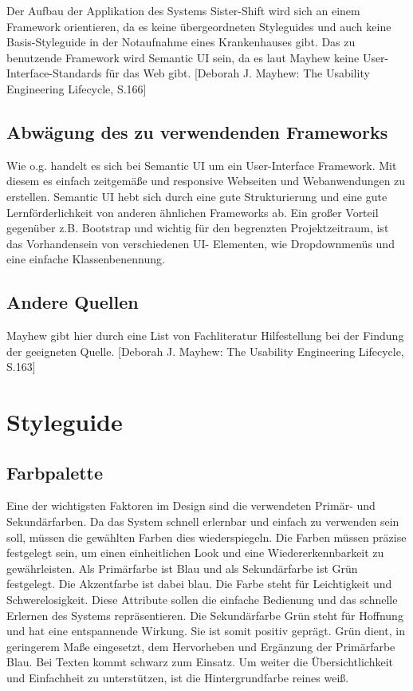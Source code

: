 \documentclass[11pt,
paper=a4,
bibtotocnumbered,	  %
liststotocnumbered,  %
DIV=calc,		  %
tablecaptionabove,	  %
headinclude,
]{article}
\begin{document}
Der Aufbau der Applikation des Systems Sister-Shift wird sich an einem Framework orientieren, da es keine übergeordneten Styleguides und auch keine Basis-Styleguide in der Notaufnahme eines Krankenhauses gibt. Das zu benutzende Framework wird Semantic UI sein, da es laut Mayhew keine User-Interface-Standards für das Web gibt. [Deborah J. Mayhew: The Usability Engineering Lifecycle, S.166]
\subsection{Abwägung des zu verwendenden Frameworks}
Wie o.g. handelt es sich bei Semantic UI um ein User-Interface Framework. Mit diesem es einfach zeitgemäße und responsive Webseiten und Webanwendungen zu erstellen. Semantic UI hebt sich durch eine gute Strukturierung und eine gute Lernförderlichkeit von anderen ähnlichen Frameworks ab. Ein großer Vorteil gegenüber z.B. Bootstrap und wichtig für den begrenzten Projektzeitraum, ist das Vorhandensein von verschiedenen UI- Elementen, wie Dropdownmenüs und eine einfache Klassenbenennung.
\subsection{Andere Quellen}
Mayhew gibt hier durch eine List von Fachliteratur Hilfestellung bei der Findung der geeigneten Quelle. [Deborah J. Mayhew: The Usability Engineering Lifecycle, S.163]
\section{Styleguide}
\subsection{Farbpalette}
Eine der wichtigsten Faktoren im Design sind die verwendeten Primär- und Sekundärfarben. Da das System schnell erlernbar und einfach zu verwenden sein soll, müssen die gewählten Farben dies wiederspiegeln. Die Farben müssen präzise festgelegt sein, um einen einheitlichen Look und eine Wiedererkennbarkeit zu gewährleisten. Als Primärfarbe ist Blau und als Sekundärfarbe ist Grün festgelegt. Die Akzentfarbe ist dabei blau. Die Farbe steht für Leichtigkeit und Schwerelosigkeit. Diese Attribute sollen die einfache Bedienung und das schnelle Erlernen des Systems repräsentieren. Die Sekundärfarbe Grün steht für Hoffnung und hat eine entspannende Wirkung. Sie ist somit positiv geprägt. Grün dient, in geringerem Maße eingesetzt, dem Hervorheben und Ergänzung der Primärfarbe Blau. Bei Texten kommt schwarz zum Einsatz. Um weiter die Übersichtlichkeit und Einfachheit zu unterstützen, ist die Hintergrundfarbe reines weiß.
\end{document}
